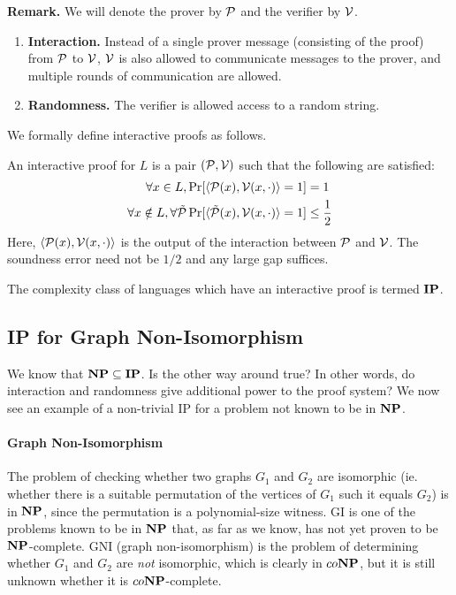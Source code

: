 \textbf{Remark.} We will denote the prover by $\mathcal{P}$ and the verifier by $\mathcal{V}$.

\begin{enumerate}
	\item\textbf{Interaction.} Instead of a single prover message (consisting of the proof) from $\mathcal{P}$ to $\mathcal{V}$, $\mathcal{V}$ is also allowed to communicate messages to the prover, and multiple rounds of communication are allowed.
	\item\textbf{Randomness.} The verifier is allowed access to a random string. 
\end{enumerate}

We formally define interactive proofs as follows.

\begin{definition}
	An interactive proof for $L$ is a pair $(\mathcal{P},\mathcal{V})$ such that the following are satisfied:
	\begin{align*}
		\forall x\in L, &\Pr[\langle\mathcal{P}(x), \mathcal{V}(x, \cdot)\rangle=1]=1\\
		\forall x\notin L,\forall\tilde{\mathcal{P}} &\Pr[\langle\tilde{\mathcal{P}}(x), \mathcal{V}(x, \cdot)\rangle=1]\leq\frac{1}{2}
	\end{align*}
	Here, $\langle\mathcal{P}(x), \mathcal{V}(x, \cdot)\rangle$ is the output of the interaction between $\mathcal{P}$ and $\mathcal{V}$. The soundness error need not be $1/2$ and any large gap suffices.
\end{definition}

The complexity class of languages which have an interactive proof is termed $\mathbf{IP}$.

\subsection{IP for Graph Non-Isomorphism}

We know that $\mathbf{NP}\subseteq\mathbf{IP}$. Is the other way around true? In other words, do interaction and randomness give additional power to the proof system? We now see an example of a non-trivial IP for a problem not known to be in $\mathbf{NP}$.

\paragraph{Graph Non-Isomorphism} The problem of checking whether two graphs $G_1$ and $G_2$ are isomorphic (ie. whether there is a suitable permutation of the vertices of $G_1$ such it equals $G_2$) is in $\mathbf{NP}$, since the permutation is a polynomial-size witness. GI is one of the problems known to be in $\mathbf{NP}$ that, as far as we know, has not yet proven to be $\mathbf{NP}$-complete. GNI (graph non-isomorphism) is the problem of determining whether $G_1$ and $G_2$ are \textit{not} isomorphic, which is clearly in $co\mathbf{NP}$, but it is still unknown whether it is $co\mathbf{NP}$-complete.

